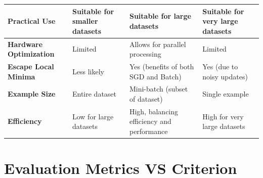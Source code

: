 \begin{customTableWrapper}{2}
\begin{longtable}{|p{2.5cm}|p{4cm}|p{3.5cm}|p{3.5cm}|}
    \textbf{Practical Use} & Suitable for smaller datasets & Suitable for large datasets & Suitable for very large datasets \\
    \hline
    
    \textbf{Hardware Optimization} & Limited & Allows for parallel processing & Limited \\
    \hline
    
    \textbf{Escape Local Minima} & Less likely & Yes (benefits of both SGD and Batch) & Yes (due to noisy updates) \\
    \hline
    
    \textbf{Example Size} & Entire dataset & Mini-batch (subset of dataset) & Single example \\
    \hline
    
    \textbf{Efficiency} & Low for large datasets & High, balancing efficiency and performance & High for very large datasets \\
    \hline

\end{longtable}
\end{customTableWrapper}


\section{Evaluation Metrics VS Criterion}\label{Evaluation Metrics VS Criterion}

